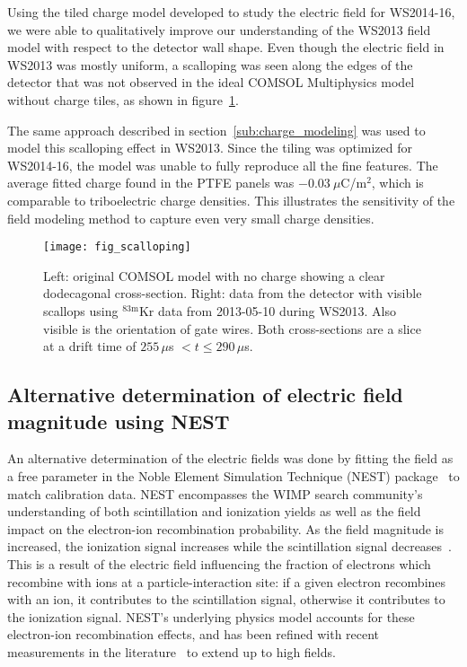 \documentclass[11pt,a4paper]{article}
\newcommand{\isot}[2]{$^{\textrm{#2}}$#1 }
\newcommand{\krm}{\isot{Kr}{83m}}
\begin{document}
Using the tiled charge model developed to study the electric field for WS2014-16, we were able to qualitatively improve our understanding of the WS2013 field model with respect to the detector wall shape. Even though the electric field in WS2013 was mostly uniform, a scalloping was seen along the edges of the detector that was not observed in the ideal \textsc{COMSOL} Multiphysics model without charge tiles, as shown in figure~\ref{fig:scalloping}.

The same approach described in section~\ref{sub:charge_modeling} was used to model this scalloping effect in WS2013. Since the tiling was optimized for WS2014-16, the model was unable to fully reproduce all the fine features. The average fitted charge found in the PTFE panels was $-0.03~\mu$C/m$^2$, which is comparable to triboelectric charge densities. This illustrates the sensitivity of the field modeling method to capture even very small charge densities.

\begin{figure}[ht!]
\begin{center}
\texttt{[image: fig\_scalloping]}
\caption{Left: original \textsc{COMSOL} model with no charge showing a clear dodecagonal cross-section. Right: data from the detector with visible scallops using \krm data from 2013-05-10 during WS2013. Also visible is the orientation of gate wires. Both cross-sections are a slice at a drift time of $255\,\mu$s $ < t \leq 290\,\mu $s.}
\label{fig:scalloping}
\end{center} 
\end{figure}


\subsection{Alternative determination of electric field magnitude using NEST}
An alternative determination of the electric fields was done by fitting the field as a free parameter in the Noble Element Simulation Technique (NEST) package~\cite{Szydagis:2013sih} to match calibration data. NEST encompasses the WIMP search community's understanding of both scintillation and ionization yields as well as the field impact on the electron-ion recombination probability. As the field magnitude is increased, the ionization signal increases while the scintillation signal decreases~\cite{Aprile:2006kx}. This is a result of the electric field influencing the fraction of electrons which recombine with ions at a particle-interaction site: if a given electron recombines with an ion, it contributes to the scintillation signal, otherwise it contributes to the ionization signal. NEST's underlying physics model accounts for these electron-ion recombination effects, and has been refined with recent measurements in the literature~\cite{Lin:2015jta} to extend up to high fields.
\end{document}
